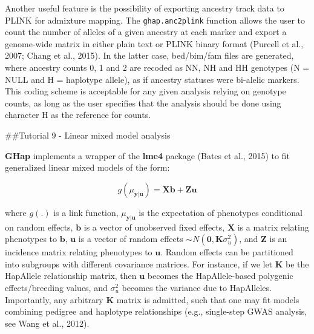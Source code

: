 \documentclass[
]{article}
\newenvironment{Shaded}{}{}
\newcommand{\CommentTok}[1]{\textcolor[rgb]{0.00,0.50,0.00}{#1}}
\newcommand{\DataTypeTok}[1]{#1}
\newcommand{\DecValTok}[1]{#1}
\newcommand{\KeywordTok}[1]{\textcolor[rgb]{0.00,0.00,1.00}{#1}}
\newcommand{\NormalTok}[1]{#1}
\newcommand{\OperatorTok}[1]{#1}
\newcommand{\StringTok}[1]{\textcolor[rgb]{0.00,0.50,0.50}{#1}}
\begin{document}
Another useful feature is the possibility of exporting ancestry track
data to PLINK for admixture mapping. The \texttt{ghap.anc2plink}
function allows the user to count the number of alleles of a given
ancestry at each marker and export a genome-wide matrix in either plain
text or PLINK binary format (Purcell et al., 2007; Chang et al., 2015).
In the latter case, bed/bim/fam files are generated, where ancestry
counts 0, 1 and 2 are recoded as NN, NH and HH genotypes (N = NULL and H
= haplotype allele), as if ancestry statuses were bi-alelic markers.
This coding scheme is acceptable for any given analysis relying on
genotype counts, as long as the user specifies that the analysis should
be done using character H as the reference for counts.

\begin{Shaded}
\end{Shaded}

\pagebreak

\#\#Tutorial 9 - Linear mixed model analysis

\textbf{GHap} implements a wrapper of the \textbf{lme4} package (Bates
et al., 2015) to fit generalized linear mixed models of the form:

\[g(\mu_{\mathbf{y}|\mathbf{u}}) = \mathbf{Xb} + \mathbf{Zu}\]

where \(g(.)\) is a link function, \(\mu_{\mathbf{y}|\mathbf{u}}\) is
the expectation of phenotypes conditional on random effects,
\(\mathbf{b}\) is a vector of unobserved fixed effects, \(\mathbf{X}\)
is a matrix relating phenotypes to \(\mathbf{b}\), \(\mathbf{u}\) is a
vector of random effects \(\sim N(\mathbf{0},\mathbf{K}\sigma_u^2)\),
and \(\mathbf{Z}\) is an incidence matrix relating phenotypes to
\(\mathbf{u}\). Random effects can be partitioned into subgroups with
different covariance matrices. For instance, if we let \(\mathbf{K}\) be
the HapAllele relationship matrix, then \(\mathbf{u}\) becomes the
HapAllele-based polygenic effects/breeding values, and \(\sigma_u^2\)
becomes the variance due to HapAlleles. Importantly, any arbitrary
\(\mathbf{K}\) matrix is admitted, such that one may fit models
combining pedigree and haplotype relationships (e.g., single-step GWAS
analysis, see Wang et al., 2012).
\end{document}
